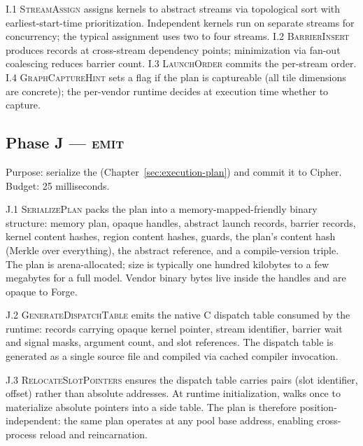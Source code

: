 I.1 \textsc{StreamAssign} assigns kernels to abstract streams via topological sort with earliest-start-time prioritization.
Independent kernels run on separate streams for concurrency; the typical assignment uses two to four streams.
I.2 \textsc{BarrierInsert} produces  records at cross-stream dependency points; minimization via fan-out coalescing reduces barrier count.
I.3 \textsc{LaunchOrder} commits the per-stream order.
I.4 \textsc{GraphCaptureHint} sets a flag if the plan is captureable (all tile dimensions are concrete); the per-vendor runtime decides at execution time whether to capture.

\subsection{Phase J --- \textsc{emit}}
\label{sec:forge-phase-j}

Purpose: serialize the  (Chapter~\ref{sec:execution-plan}) and commit it to Cipher.
Budget: 25 milliseconds.

J.1 \textsc{SerializePlan} packs the plan into a memory-mapped-friendly binary structure: memory plan, opaque  handles, abstract launch records, barrier records, kernel content hashes, region content hashes, guards, the plan's content hash (Merkle over everything), the abstract  reference, and a compile-version triple.
The plan is arena-allocated; size is typically one hundred kilobytes to a few megabytes for a full model.
Vendor binary bytes live inside the  handles and are opaque to Forge.

J.2 \textsc{GenerateDispatchTable} emits the native C\nolinebreak\hspace{0.05em}\raisebox{0.4ex}{\tiny ++} dispatch table consumed by the runtime:  records carrying opaque kernel pointer, stream identifier, barrier wait and signal masks, argument count, and slot references.
The dispatch table is generated as a single source file and compiled via cached compiler invocation.

J.3 \textsc{RelocateSlotPointers} ensures the dispatch table carries  pairs (slot identifier, offset) rather than absolute addresses.
At runtime initialization,  walks once to materialize absolute pointers into a side table.
The plan is therefore position-independent: the same plan operates at any pool base address, enabling cross-process reload and reincarnation.

